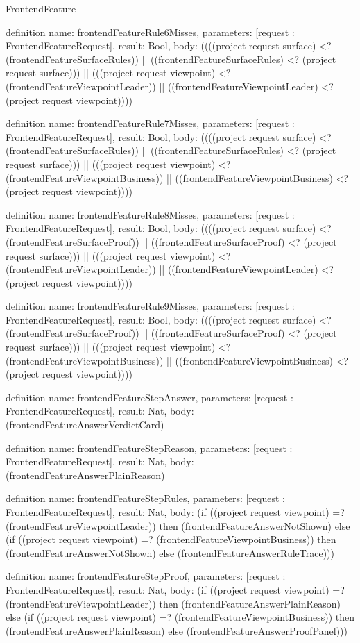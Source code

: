 \begin{lexlean}{FrontendFeature}
\begin{semanticmodule}
definition{
  name: frontendFeatureRule6Misses,
  parameters: [request : FrontendFeatureRequest],
  result: Bool,
  body: ((((project request surface) <? (frontendFeatureSurfaceRules)) || ((frontendFeatureSurfaceRules) <? (project request surface))) || (((project request viewpoint) <? (frontendFeatureViewpointLeader)) || ((frontendFeatureViewpointLeader) <? (project request viewpoint))))
}

definition{
  name: frontendFeatureRule7Misses,
  parameters: [request : FrontendFeatureRequest],
  result: Bool,
  body: ((((project request surface) <? (frontendFeatureSurfaceRules)) || ((frontendFeatureSurfaceRules) <? (project request surface))) || (((project request viewpoint) <? (frontendFeatureViewpointBusiness)) || ((frontendFeatureViewpointBusiness) <? (project request viewpoint))))
}

definition{
  name: frontendFeatureRule8Misses,
  parameters: [request : FrontendFeatureRequest],
  result: Bool,
  body: ((((project request surface) <? (frontendFeatureSurfaceProof)) || ((frontendFeatureSurfaceProof) <? (project request surface))) || (((project request viewpoint) <? (frontendFeatureViewpointLeader)) || ((frontendFeatureViewpointLeader) <? (project request viewpoint))))
}

definition{
  name: frontendFeatureRule9Misses,
  parameters: [request : FrontendFeatureRequest],
  result: Bool,
  body: ((((project request surface) <? (frontendFeatureSurfaceProof)) || ((frontendFeatureSurfaceProof) <? (project request surface))) || (((project request viewpoint) <? (frontendFeatureViewpointBusiness)) || ((frontendFeatureViewpointBusiness) <? (project request viewpoint))))
}

definition{
  name: frontendFeatureStepAnswer,
  parameters: [request : FrontendFeatureRequest],
  result: Nat,
  body: (frontendFeatureAnswerVerdictCard)
}

definition{
  name: frontendFeatureStepReason,
  parameters: [request : FrontendFeatureRequest],
  result: Nat,
  body: (frontendFeatureAnswerPlainReason)
}

definition{
  name: frontendFeatureStepRules,
  parameters: [request : FrontendFeatureRequest],
  result: Nat,
  body: (if ((project request viewpoint) =? (frontendFeatureViewpointLeader)) then (frontendFeatureAnswerNotShown) else (if ((project request viewpoint) =? (frontendFeatureViewpointBusiness)) then (frontendFeatureAnswerNotShown) else (frontendFeatureAnswerRuleTrace)))
}

definition{
  name: frontendFeatureStepProof,
  parameters: [request : FrontendFeatureRequest],
  result: Nat,
  body: (if ((project request viewpoint) =? (frontendFeatureViewpointLeader)) then (frontendFeatureAnswerPlainReason) else (if ((project request viewpoint) =? (frontendFeatureViewpointBusiness)) then (frontendFeatureAnswerPlainReason) else (frontendFeatureAnswerProofPanel)))
}


\end{semanticmodule}
\end{lexlean}
